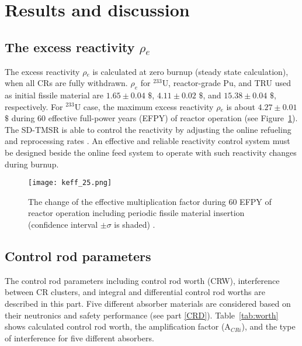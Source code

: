 \section{Results and discussion} \label{Results-and-discussion}

\subsection{The excess reactivity $\rho$$_e$}

The excess reactivity $\rho$$_e$ is calculated at zero burnup (steady state 
calculation), when all CRs are fully withdrawn. $\rho_e$ for $^{233}$U, 
reactor-grade Pu, and TRU used as initial fissile material are $1.65\pm0.04$ 
$\$$, $4.11\pm0.02$ $\$$, and $15.38\pm0.04$ $\$$, respectively. For $^{233}$U 
case, the maximum excess reactivity $\rho$$_e$ is about $4.27\pm0.01$ $\$$ 
during 60 effective full-power years (EFPY) of reactor operation (see 
Figure~\ref{fig:keff_25}). 
The SD-TMSR is able to control the reactivity by adjusting the online 
refueling and reprocessing rates \cite{ashraf2019whole_core}. An effective and 
reliable reactivity control system must be designed beside the online feed 
system to operate with such reactivity changes during burnup.

\begin{figure}
	\centering
	\texttt{[image: keff\_25.png]}
	\vspace{-0.5in}
	\caption{The change of the effective multiplication factor during 60 EFPY of reactor operation including periodic fissile material insertion (confidence interval $\pm\sigma$ is shaded) \cite{ashraf2019whole_core}.} 
	\label{fig:keff_25}
\end{figure}

\subsection{Control rod parameters}

The control rod parameters including control rod worth (CRW), interference 
between CR clusters, and integral and differential control rod worths are 
described in this part. Five different absorber materials are considered based 
on their neutronics and safety performance (see part \ref{CRD}). 
Table~\ref{tab:worth} shows calculated control rod worth, the amplification 
factor (A$_{CRi}$), and the type of interference for five different 
absorbers.

